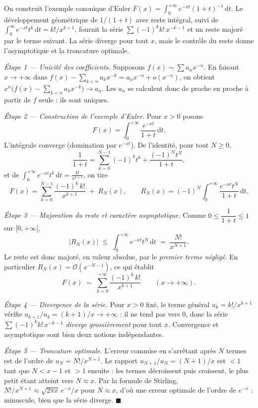 \begin{ideepreuve}
On construit l'exemple canonique d'Euler $F(x)=\int_0^{+\infty}e^{-xt}(1+t)^{-1}\,
\mathrm{d}t$. Le développement géométrique de $1/(1+t)$ avec reste intégral, suivi
de $\int_0^\infty e^{-xt}t^k\,\mathrm{d}t=k!/x^{k+1}$, fournit la série
$\sum(-1)^k k!\,x^{-k-1}$ et un reste majoré par le terme suivant. La série
diverge pour tout $x$, mais le contrôle du reste donne l'asymptotique et la
troncature optimale.
\end{ideepreuve}

\vspace{10pt}

\begin{mdframed}[style=proofbar]
  \textit{Étape 1 — Unicité des coefficients.}
  Supposons $f(x)\sim\sum a_n x^{-n}$. En faisant $x\to+\infty$ dans
  $f(x)-\sum_{k<n}a_k x^{-k}=a_n x^{-n}+o(x^{-n})$, on obtient
  $x^{n}\bigl(f(x)-\sum_{k<n}a_k x^{-k}\bigr)\to a_n$. Les $a_n$ se calculent
  donc de proche en proche à partir de $f$ seule : ils sont uniques.

  \medskip
  \textit{Étape 2 — Construction de l'exemple d'Euler.}
  Pour $x>0$ posons
  \[
    F(x)=\int_{0}^{+\infty}\frac{e^{-xt}}{1+t}\,\mathrm{d}t .
  \]
  L'intégrale converge (domination par $e^{-xt}$). De l'identité, pour tout
  $N\geq 0$,
  \[
    \frac{1}{1+t}=\sum_{k=0}^{N-1}(-1)^k t^{k}
      +\frac{(-1)^{N}t^{N}}{1+t},
  \]
  et de $\displaystyle\int_0^{+\infty}e^{-xt}t^{k}\,\mathrm{d}t=\frac{k!}{x^{k+1}}$,
  on tire
  \[
    F(x)=\sum_{k=0}^{N-1}\frac{(-1)^{k}\,k!}{x^{k+1}}
      \;+\; R_N(x),
    \qquad
    R_N(x)=(-1)^{N}\!\int_{0}^{+\infty}\frac{e^{-xt}t^{N}}{1+t}\,\mathrm{d}t .
  \]

  \medskip
  \textit{Étape 3 — Majoration du reste et caractère asymptotique.}
  Comme $0\leq \dfrac{1}{1+t}\leq 1$ sur $[0,+\infty[$,
  \[
    |R_N(x)|\;\leq\;\int_{0}^{+\infty}e^{-xt}t^{N}\,\mathrm{d}t
    \;=\;\frac{N!}{x^{N+1}} .
  \]
  Le reste est donc majoré, en valeur absolue, par le \emph{premier terme
  négligé}. En particulier $R_N(x)=\mathcal{O}(x^{-N-1})$, ce qui établit
  \[
    F(x)\;\sim\;\sum_{k=0}^{+\infty}\frac{(-1)^{k}\,k!}{x^{k+1}}
    \qquad (x\to+\infty).
  \]

  \medskip
  \textit{Étape 4 — Divergence de la série.}
  Pour $x>0$ fixé, le terme général $u_k=k!/x^{k+1}$ vérifie
  $u_{k+1}/u_k=(k+1)/x\to+\infty$ : il ne tend pas vers $0$, donc la série
  $\sum(-1)^k k!\,x^{-k-1}$ \emph{diverge grossièrement} pour tout $x$.
  Convergence et asymptotique sont bien deux notions indépendantes.

  \medskip
  \textit{Étape 5 — Troncature optimale.}
  L'erreur commise en s'arrêtant après $N$ termes est de l'ordre de
  $u_N=N!/x^{N+1}$. Le rapport $u_{N+1}/u_N=(N+1)/x$ est $<1$ tant que $N<x-1$ et
  $>1$ ensuite : les termes décroissent puis croissent, le plus petit étant
  atteint vers $N\approx x$. Par la formule de Stirling,
  $N!/x^{N+1}\approx \sqrt{2\pi x}\,e^{-x}/x$ pour $N\approx x$, d'où une erreur
  optimale de l'ordre de $e^{-x}$ : minuscule, bien que la série diverge.
  \hfill$\blacksquare$
\end{mdframed}

